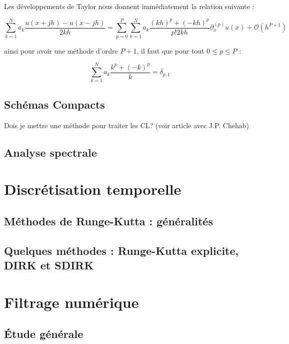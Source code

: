 Les développements de Taylor nous donnent immédiatement la relation
suivante :

\begin{equation}
\label{eq:taylor}
 \sum_{k=1}^N a_k \dfrac{u(x+jh) - u(x-jh)}{2kh} = \sum_{p=0}^{P}
 \sum_{k=1}^N a_k \dfrac{(kh)^p + (-kh)^p}{p! 2 k h} \partial_x^{(p)} u(x)
 + \mathcal{O} \left( h^{P+1} \right)
\end{equation}

ainsi pour avoir une méthode d'ordre $P+1$, il faut que pour tout $0
\leq p \leq P$ :

\begin{equation}
\sum_{k=1}^N a_k \dfrac{k^p + (-k)^p}{k} = \delta_{p,1}
\end{equation}


\subsection{Schémas Compacts }









Dois je mettre une méthode pour traiter les CL? (voir article avec J.P. Chehab)

\subsection{Analyse spectrale}


\section{Discrétisation temporelle}

\subsection{Méthodes de Runge-Kutta : généralités}

\subsection{Quelques méthodes : Runge-Kutta explicite, DIRK et SDIRK}


\section{Filtrage numérique}

\subsection{\'Etude générale}

